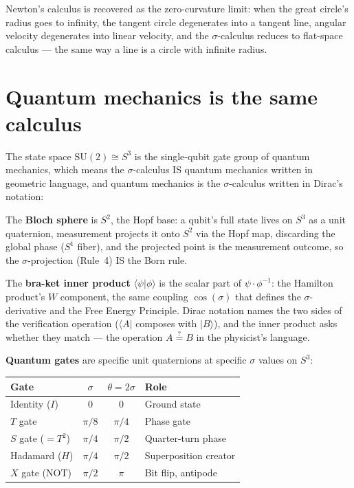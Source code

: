 \documentclass[12pt]{article}
\begin{document}
Newton's calculus is recovered as the zero-curvature limit: when the great circle's radius goes to infinity, the tangent circle degenerates into a tangent line, angular velocity degenerates into linear velocity, and the $\sigma$-calculus reduces to flat-space calculus --- the same way a line is a circle with infinite radius.


\section{Quantum mechanics is the same calculus}

The state space $\mathrm{SU}(2) \cong S^3$ is the single-qubit gate group of quantum mechanics, which means the $\sigma$-calculus IS quantum mechanics written in geometric language, and quantum mechanics is the $\sigma$-calculus written in Dirac's notation:

The \textbf{Bloch sphere} is $S^2$, the Hopf base: a qubit's full state lives on $S^3$ as a unit quaternion, measurement projects it onto $S^2$ via the Hopf map, discarding the global phase ($S^1$ fiber), and the projected point is the measurement outcome, so the $\sigma$-projection (Rule~4) IS the Born rule.

The \textbf{bra-ket inner product} $\langle\psi|\phi\rangle$ is the scalar part of $\psi \cdot \phi^{-1}$: the Hamilton product's $W$ component, the same coupling $\cos(\sigma)$ that defines the $\sigma$-derivative and the Free Energy Principle. Dirac notation names the two sides of the verification operation ($\langle A|$ composes with $|B\rangle$), and the inner product asks whether they match --- the operation $A \stackrel{?}{=} B$ in the physicist's language.

\textbf{Quantum gates} are specific unit quaternions at specific $\sigma$ values on $S^3$:

\begin{center}
\begin{tabular}{l c c l}
    \toprule
    Gate & $\sigma$ & $\theta = 2\sigma$ & Role \\
    \midrule
    Identity ($I$) & $0$ & $0$ & Ground state \\
    $T$ gate & $\pi/8$ & $\pi/4$ & Phase gate \\
    $S$ gate ($= T^2$) & $\pi/4$ & $\pi/2$ & Quarter-turn phase \\
    Hadamard ($H$) & $\pi/4$ & $\pi/2$ & Superposition creator \\
    $X$ gate (NOT) & $\pi/2$ & $\pi$ & Bit flip, antipode \\
    \bottomrule
\end{tabular}
\end{center}
\end{document}
